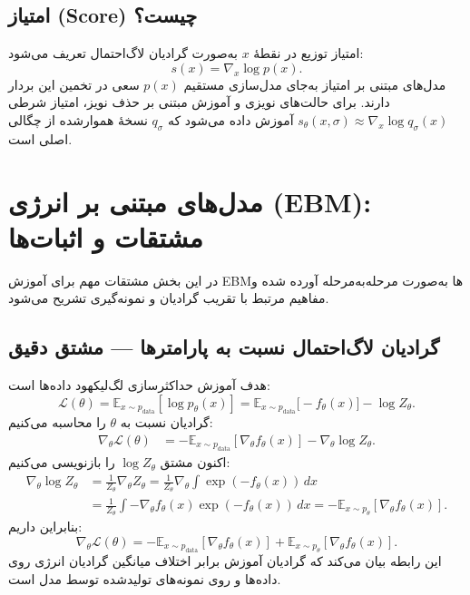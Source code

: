\subsection{امتیاز (Score) چیست؟}
امتیاز توزیع در نقطهٔ \(x\) به‌صورت گرادیان لاگ‌احتمال تعریف می‌شود:
\begin{equation}
s(x) = \nabla_x \log p(x).
\end{equation}
مدل‌های مبتنی بر امتیاز به‌جای مدل‌سازی مستقیم \(p(x)\) سعی در تخمین این بردار دارند. برای حالت‌های نویزی و آموزش مبتنی بر حذف نویز، امتیاز شرطی \(s_{\theta}(x,\sigma) \approx \nabla_x \log q_{\sigma}(x)\) آموزش داده می‌شود که \(q_{\sigma}\) نسخهٔ هموارشده از چگالی اصلی است.

\section{مدل‌های مبتنی بر انرژی (EBM): مشتقات و اثبات‌ها}
در این بخش مشتقات مهم برای آموزش EBMها به‌صورت مرحله‌به‌مرحله آورده شده و مفاهیم مرتبط با تقریب گرادیان و نمونه‌گیری تشریح می‌شود.

\subsection{گرادیان لاگ‌احتمال نسبت به پارامترها — مشتق دقیق}
هدف آموزش حداکثرسازی لگ‌لیکهود داده‌ها است:
\begin{equation}
\mathcal{L}(\theta)=\mathbb{E}_{x\sim p_{\text{data}}}[\log p_{\theta}(x)] = \mathbb{E}_{x\sim p_{\text{data}}}\big[-f_{\theta}(x)\big] - \log Z_{\theta}.
\end{equation}
گرادیان نسبت به \(\theta\) را محاسبه می‌کنیم:
\begin{align}
\nabla_{\theta} \mathcal{L}(\theta) &= -\mathbb{E}_{x\sim p_{\text{data}}}[\nabla_{\theta} f_{\theta}(x)] - \nabla_{\theta} \log Z_{\theta}.
\end{align}
اکنون مشتق \(\log Z_{\theta}\) را بازنویسی می‌کنیم:
\begin{align}
\nabla_{\theta} \log Z_{\theta} &= \frac{1}{Z_{\theta}} \nabla_{\theta} Z_{\theta} = \frac{1}{Z_{\theta}} \nabla_{\theta} \int \exp(-f_{\theta}(x))\,dx \\
&= \frac{1}{Z_{\theta}} \int -\nabla_{\theta} f_{\theta}(x) \exp(-f_{\theta}(x))\,dx = -\mathbb{E}_{x\sim p_{\theta}}[\nabla_{\theta} f_{\theta}(x)].
\end{align}
بنابراین داریم:
\begin{equation}\label{eq:grad_exact}
\boxed{\nabla_{\theta} \mathcal{L}(\theta) = -\mathbb{E}_{x\sim p_{\text{data}}}[\nabla_{\theta} f_{\theta}(x)] + \mathbb{E}_{x\sim p_{\theta}}[\nabla_{\theta} f_{\theta}(x)].}
\end{equation}
این رابطه بیان می‌کند که گرادیان آموزش برابر اختلاف میانگین گرادیان انرژی روی داده‌ها و روی نمونه‌های تولیدشده توسط مدل است.

